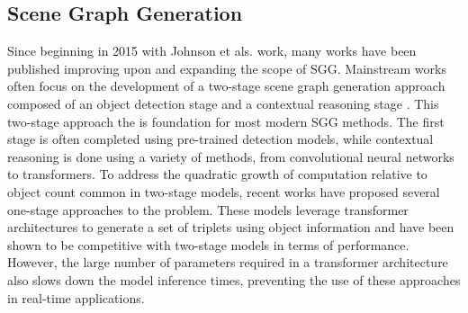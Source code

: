 \documentclass{article}
\begin{document}
\subsection*{Scene Graph Generation}
Since beginning in 2015 with Johnson et als. work\cite{johnson2015image}, many works have been published improving upon and expanding the scope of SGG\cite{cong2023reltr,desai2021learning,yang2018graph,li2021bipartite,jung2023devil,li2022sgtr,plummer2020revisiting,jin2023fast,lee2018multi,dornadula2019visual,gu2019scene,tripathi2019using,liang2017deep,tang2020unbiased,chiou2021recovering,yan2020pcpl}. Mainstream works often focus on the development of a two-stage scene graph generation approach composed of an object detection stage and a contextual reasoning stage \cite{yang2018graph,jung2023devil}. This two-stage approach the is foundation for most modern SGG methods\cite{yang2018graph,desai2021learning,li2021bipartite,dornadula2019visual,gu2019scene}.
The first stage is often completed using pre-trained detection models\cite{carion2020end}, while contextual reasoning is done using a variety of methods, from convolutional neural networks\cite{yang2018graph} to transformers\cite{cong2023reltr}. To address the quadratic growth of computation relative to object count common in two-stage models, recent works have proposed several one-stage approaches to the problem\cite{cong2023reltr,li2022sgtr}. These models leverage transformer architectures to generate a set of triplets using object information and have been shown to be competitive with two-stage models in terms of performance. However, the large number of parameters required in a transformer architecture also slows down the model inference times, preventing the use of these approaches in real-time applications\cite{cong2023reltr,liang2017deep}.
\end{document}
